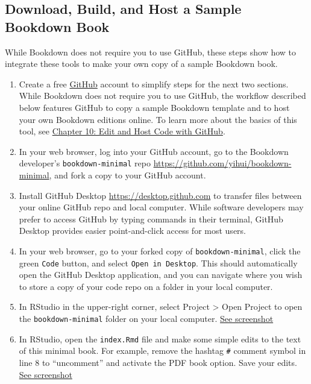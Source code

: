 \documentclass[
  english,
]{book}
\begin{document}
\hypertarget{download-build-and-host-a-sample-bookdown-book}{%
\subsection*{Download, Build, and Host a Sample Bookdown Book}\label{download-build-and-host-a-sample-bookdown-book}}

While Bookdown does not require you to use GitHub, these steps show how to integrate these tools to make your own copy of a sample Bookdown book.

\begin{enumerate}
\def\labelenumi{\arabic{enumi}.}
\item
  Create a free \href{https://github.com}{GitHub} account to simplify steps for the next two sections. While Bookdown does not require you to use GitHub, the workflow described below features GitHub to copy a sample Bookdown template and to host your own Bookdown editions online. To learn more about the basics of this tool, see \href{github.html}{Chapter 10: Edit and Host Code with GitHub}.
\item
  In your web browser, log into your GitHub account, go to the Bookdown developer's \texttt{bookdown-minimal} repo \url{https://github.com/yihui/bookdown-minimal}, and fork a copy to your GitHub account.
\item
  Install GitHub Desktop \url{https://desktop.github.com} to transfer files between your online GitHub repo and local computer. While software developers may prefer to access GitHub by typing commands in their terminal, GitHub Desktop provides easier point-and-click access for most users.
\item
  In your web browser, go to your forked copy of \texttt{bookdown-minimal}, click the green \texttt{Code} button, and select \texttt{Open\ in\ Desktop}. This should automatically open the GitHub Desktop application, and you can navigate where you wish to store a copy of your code repo on a folder in your local computer.
\item
  In RStudio in the upper-right corner, select Project \textgreater{} Open Project to open the \texttt{bookdown-minimal} folder on your local computer. \href{images/20-bookdown/project-open.png}{See screenshot}
\item
  In RStudio, open the \texttt{index.Rmd} file and make some simple edits to the text of this minimal book. For example, remove the hashtag \texttt{\#} comment symbol in line 8 to ``uncomment'' and activate the PDF book option. Save your edits. \href{images/20-bookdown/edit-book.png}{See screenshot}

\end{enumerate}
\end{document}
